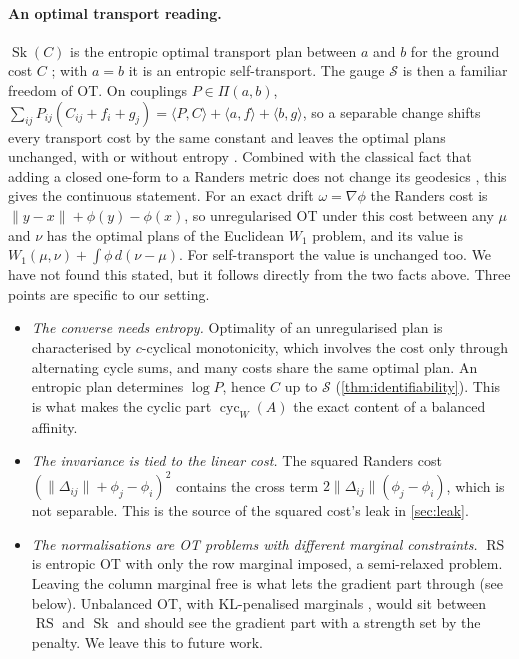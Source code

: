 \documentclass{article}
\theoremstyle{plain}
\theoremstyle{definition}
\theoremstyle{remark}
\newcommand{\1}{\mathbf{1}}
\newcommand{\Sep}{\mathcal{S}}
\newcommand{\cyc}{\operatorname{cyc}}
\newcommand{\Sk}{\operatorname{Sk}}
\newcommand{\RS}{\operatorname{RS}}
\begin{document}
\paragraph{An optimal transport reading.}
$\Sk(C)$ is the entropic optimal transport plan between $a$ and $b$ for
the ground cost $C$ \citep{cuturi2013sinkhorn,peyre2019computational};
with $a=b$ it is an entropic self-transport. The gauge $\Sep$ is then a
familiar freedom of OT. On couplings $P\in\Pi(a,b)$,
$\sum_{ij}P_{ij}(C_{ij}+f_i+g_j)=\langle P,C\rangle+\langle a,f\rangle+\langle b,g\rangle$,
so a separable change shifts every transport cost by the same constant
and leaves the optimal plans unchanged, with or without entropy
\citep{villani2009optimal,santambrogio2015optimal}. Combined with the
classical fact that adding a closed one-form to a Randers metric does not
change its geodesics \citep{bao2000introduction}, this gives the
continuous statement. For an exact drift $\omega=\nabla\phi$ the Randers
cost is $\|y-x\|+\phi(y)-\phi(x)$, so unregularised OT under this cost
between any $\mu$ and $\nu$ has the optimal plans of the Euclidean
$W_1$ problem, and its value is $W_1(\mu,\nu)+\int\phi\,d(\nu-\mu)$. For
self-transport the value is unchanged too. We have not found this stated,
but it follows directly from the two facts above. Three points are
specific to our setting.
\begin{itemize}
  \item \emph{The converse needs entropy.} Optimality of an unregularised
    plan is characterised by $c$-cyclical monotonicity, which involves the
    cost only through alternating cycle sums, and many costs share the
    same optimal plan. An entropic plan determines $\log P$, hence $C$ up
    to $\Sep$ (\cref{thm:identifiability}). This is what makes the cyclic
    part $\cyc_W(A)$ the exact content of a balanced affinity.
  \item \emph{The invariance is tied to the linear cost.} The squared
    Randers cost $(\|\Delta_{ij}\|+\phi_j-\phi_i)^2$ contains the cross
    term $2\|\Delta_{ij}\|(\phi_j-\phi_i)$, which is not separable. This is
    the source of the squared cost's leak in \cref{sec:leak}.
  \item \emph{The normalisations are OT problems with different marginal
    constraints.} $\RS$ is entropic OT with only the row marginal imposed,
    a semi-relaxed problem. Leaving the column marginal free is what lets
    the gradient part through (see below). Unbalanced OT, with
    KL-penalised marginals \citep{chizat2018scaling}, would sit between
    $\RS$ and $\Sk$ and should see the gradient part with a strength set
    by the penalty. We leave this to future work.
\end{itemize}
\end{document}

